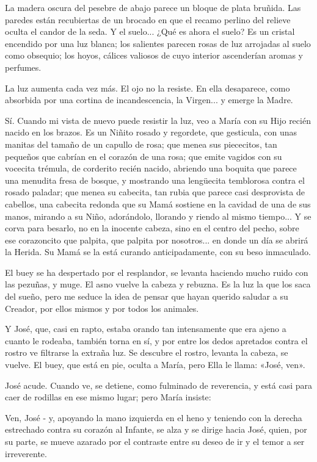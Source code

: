\documentclass[12pt]{book} %
\begin{document}
La madera oscura del pesebre de abajo parece un bloque de plata bruñida. Las paredes están recubiertas de un brocado en que el recamo perlino del relieve oculta el candor de la seda. Y el suelo... ¿Qué es ahora el suelo? Es un cristal encendido por una luz blanca; los salientes parecen rosas de luz arrojadas al suelo como obsequio; los hoyos, cálices valiosos de cuyo interior ascenderían aromas y perfumes. 

La luz aumenta cada vez más. El ojo no la resiste. En ella desaparece, como absorbida por una cortina de incandescencia, la Virgen... y emerge la Madre. 

Sí. Cuando mi vista de nuevo puede resistir la luz, veo a María con su Hijo recién nacido en los brazos. Es un Niñito rosado y regordete, que gesticula, con unas manitas del tamaño de un capullo de rosa; que menea sus piececitos, tan pequeños que cabrían en el corazón de una rosa; que emite vagidos con su vocecita trémula, de corderito recién nacido, abriendo una boquita que parece una menudita fresa de bosque, y mostrando una lengüecita temblorosa contra el rosado paladar; que menea su cabecita, tan rubia que parece casi desprovista de cabellos, una cabecita redonda que su Mamá sostiene en la cavidad de una de sus manos, mirando a su Niño, adorándolo, llorando y riendo al mismo tiempo... Y se corva para besarlo, no en la inocente cabeza, sino en el centro del pecho, sobre ese corazoncito que palpita, que palpita por nosotros... en donde un día se abrirá la Herida. Su Mamá se la está curando anticipadamente, con su beso inmaculado. 

El buey se ha despertado por el resplandor, se levanta haciendo mucho ruido con las pezuñas, y muge. El asno vuelve la cabeza y rebuzna. Es la luz la que los saca del sueño, pero me seduce la idea de pensar que hayan querido saludar a su Creador, por ellos mismos y por todos los animales. 

Y José, que, casi en rapto, estaba orando tan intensamente que era ajeno a cuanto le rodeaba, también torna en sí, y por entre los dedos apretados contra el rostro ve filtrarse la extraña luz. Se descubre el rostro, levanta la cabeza, se vuelve. El buey, que está en pie, oculta a María, pero Ella le llama: «José, ven». 

José acude. Cuando ve, se detiene, como fulminado de reverencia, y está casi para caer de rodillas en ese mismo lugar; pero María insiste: 

Ven, José - y, apoyando la mano izquierda en el heno y teniendo con la derecha estrechado contra su corazón al Infante, se alza y se dirige hacia José, quien, por su parte, se mueve azarado por el contraste entre su deseo de ir y el temor a ser irreverente. 
\end{document}
